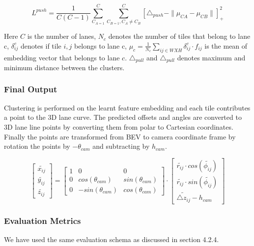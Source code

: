              \begin{equation}
                 L^{push} =  \frac{1}{C(C -1)} \sum^{C}_{C_{A=1} } \sum^{C}_{C_{B=1}, C_{A} \not =C_{B}}[ \triangle_{push} - \parallel \mu_{CA} - \mu_{CB}\parallel ]_{+}^{2}
             \end{equation}
            
            Here $C$ is the number of lanes, $N_{c}$ denotes the number of tiles that belong to lane c, $\delta_{ij}^{c}$ denotes if tile $i,j$ belongs to lane c, $\mu_{c} = \frac{1}{N_{c}} \sum_{ij \in WXH } \delta^{c}_{ij} \cdot f_{ij}$ is the mean of embedding vector that belongs to lane $c$. $\triangle_{pull}$ and $\triangle_{pull}$ denotes maximum and minimum distance between the clusters. 
            
        \subsubsection{Final Output}
        
        Clustering is performed on the learnt feature embedding and each tile contributes a point to the 3D lane curve. The predicted offsets and angles are converted to 3D lane line points by converting them from polar to Cartesian coordinates. Finally the points are transformed from BEV to camera coordinate frame by rotation the points by  $-\theta_{cam}$ and subtracting by $h_{cam}$. 
        
        \begin{equation}
            \begin{bmatrix}\widetilde{x_{ij}}  \\\widetilde{y_{ij}} \\ \widetilde{z_{ij}}  \end{bmatrix} = \begin{bmatrix}1 & 0 & 0  \\ 0  & cos(\theta_{cam}) & sin(\theta_{cam}) \\ 0  & -sin(\theta_{cam}) & cos(\theta_{cam}) \end{bmatrix} \cdot \begin{bmatrix}\widetilde{r_{ij}} \cdot cos(\widetilde{\phi_{ij}})  \\\widetilde{r_{ij}} \cdot sin(\widetilde{\phi_{ij}})  \\ \widetilde{\triangle z_{ij}} - h_{cam} \end{bmatrix}
        \end{equation}
        

        \subsubsection{Evaluation Metrics}
        We have used the same evaluation schema as discussed in section 4.2.4. 
        
